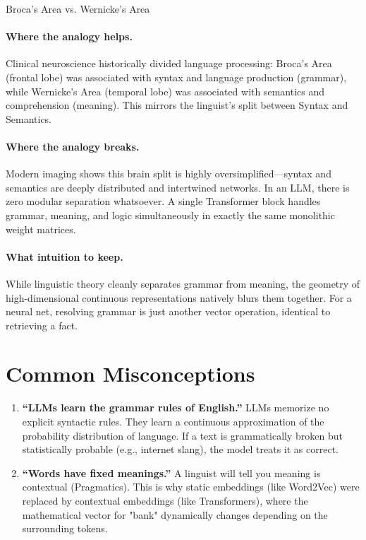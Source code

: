 \begin{analogybox}{Broca's Area vs. Wernicke's Area}
  \paragraph{Where the analogy helps.}
  Clinical neuroscience historically divided language processing: Broca's Area (frontal lobe) was associated with syntax and language production (grammar), while Wernicke's Area (temporal lobe) was associated with semantics and comprehension (meaning). This mirrors the linguist's split between Syntax and Semantics.

  \paragraph{Where the analogy breaks.}
  Modern imaging shows this brain split is highly oversimplified—syntax and semantics are deeply distributed and intertwined networks. In an LLM, there is zero modular separation whatsoever. A single Transformer block handles grammar, meaning, and logic simultaneously in exactly the same monolithic weight matrices.  

  \paragraph{What intuition to keep.}
  While linguistic theory cleanly separates grammar from meaning, the geometry of high-dimensional continuous representations natively blurs them together. For a neural net, resolving grammar is just another vector operation, identical to retrieving a fact.
\end{analogybox}


\section{Common Misconceptions}
\label{ch:05:sec:misconceptions}

\begin{enumerate}
  \item \textbf{``LLMs learn the grammar rules of English.''} LLMs memorize no explicit syntactic rules. They learn a continuous approximation of the probability distribution of language. If a text is grammatically broken but statistically probable (e.g., internet slang), the model treats it as correct.
  \item \textbf{``Words have fixed meanings.''} A linguist will tell you meaning is contextual (Pragmatics). This is why static embeddings (like Word2Vec) were replaced by contextual embeddings (like Transformers), where the mathematical vector for "bank" dynamically changes depending on the surrounding tokens.
\end{enumerate}


